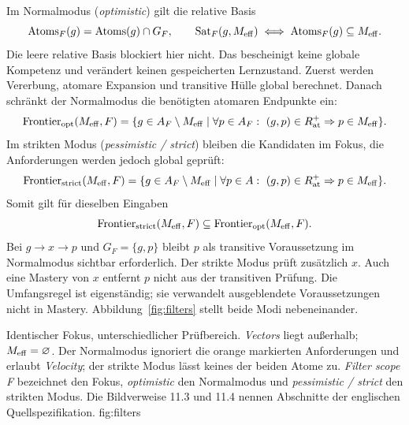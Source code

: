Im Normalmodus (\emph{optimistic}) gilt die relative Basis
\[
 \operatorname{Atoms}_F(g)=\operatorname{Atoms}(g)\cap G_F,\qquad
 \operatorname{Sat}_F(g,M_{\mathrm{eff}})\iff\operatorname{Atoms}_F(g)\subseteq M_{\mathrm{eff}}.
\]
Die leere relative Basis blockiert hier nicht. Das bescheinigt keine globale
Kompetenz und verändert keinen gespeicherten Lernzustand. Zuerst werden
Vererbung, atomare Expansion und transitive Hülle global berechnet.
Danach schränkt der Normalmodus die benötigten atomaren Endpunkte ein:
\begin{equation}
 \operatorname{Frontier}_{\mathrm{opt}}(M_{\mathrm{eff}},F)=\{g\in A_F\setminus M_{\mathrm{eff}}\mid
 \forall p\in A_F:\ (g,p)\in R_{\mathrm{at}}^+\Rightarrow p\in M_{\mathrm{eff}}\}.
\end{equation}
Im strikten Modus (\emph{pessimistic / strict}) bleiben die Kandidaten im
Fokus, die Anforderungen werden jedoch global geprüft:
\begin{equation}
 \operatorname{Frontier}_{\mathrm{strict}}(M_{\mathrm{eff}},F)=
 \{g\in A_F\setminus M_{\mathrm{eff}}\mid
 \forall p\in A:\ (g,p)\in R_{\mathrm{at}}^+\Rightarrow p\in M_{\mathrm{eff}}\}.
\end{equation}
Somit gilt für dieselben Eingaben
\[
 \operatorname{Frontier}_{\mathrm{strict}}(M_{\mathrm{eff}},F)\subseteq
 \operatorname{Frontier}_{\mathrm{opt}}(M_{\mathrm{eff}},F).
\]
Bei $g\to x\to p$ und $G_F=\{g,p\}$ bleibt $p$ als transitive
Voraussetzung im Normalmodus sichtbar erforderlich. Der strikte Modus
prüft zusätzlich $x$. Auch eine Mastery von $x$ entfernt $p$ nicht aus
der transitiven Prüfung. Die Umfangsregel ist eigenständig; sie
verwandelt ausgeblendete Voraussetzungen nicht in Mastery.
Abbildung~\ref{fig:filters} stellt beide Modi nebeneinander.

{Identischer Fokus, unterschiedlicher Prüfbereich. \emph{Vectors} liegt
außerhalb; $M_{\mathrm{eff}}=\varnothing$. Der Normalmodus ignoriert die orange
markierten Anforderungen und erlaubt \emph{Velocity}; der strikte Modus
lässt keines der beiden Atome zu. \emph{Filter scope F} bezeichnet den
Fokus, \emph{optimistic} den Normalmodus und \emph{pessimistic / strict}
den strikten Modus. Die Bildverweise 11.3 und 11.4 nennen Abschnitte der
englischen Quellspezifikation.}
{fig:filters}

